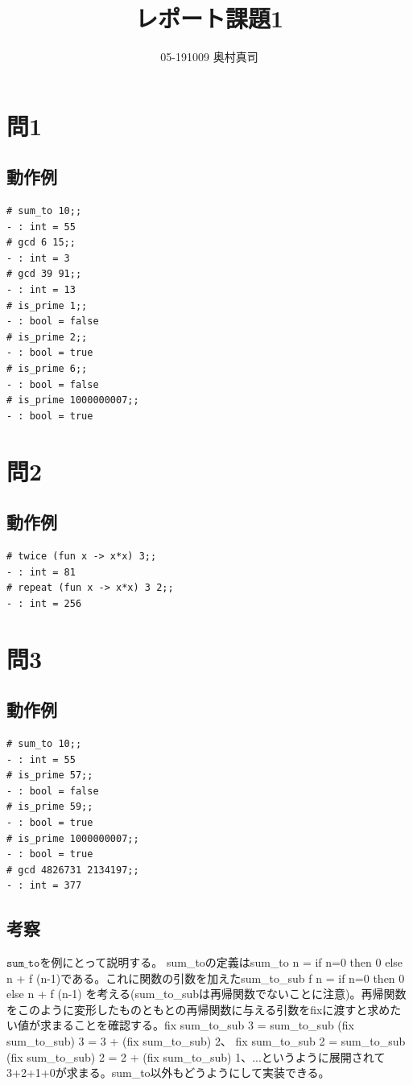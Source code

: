 \documentclass[11pt,a4paper]{jsarticle}
\title{レポート課題1}
\author{05-191009 奥村真司}
\date{}
\begin{document}
\maketitle
%
%
\section*{問1}
\subsection*{動作例}
\begin{lstlisting}[basicstyle=\ttfamily\footnotesize, frame=single]
# sum_to 10;;
- : int = 55
# gcd 6 15;;
- : int = 3
# gcd 39 91;;
- : int = 13
# is_prime 1;;
- : bool = false
# is_prime 2;;
- : bool = true
# is_prime 6;;
- : bool = false
# is_prime 1000000007;;
- : bool = true
 \end{lstlisting}

\section*{問2}
\subsection*{動作例}
\begin{lstlisting}[basicstyle=\ttfamily\footnotesize, frame=single]
# twice (fun x -> x*x) 3;;
- : int = 81
# repeat (fun x -> x*x) 3 2;;
- : int = 256
 \end{lstlisting}

\section*{問3}
\subsection*{動作例}
\begin{lstlisting}[basicstyle=\ttfamily\footnotesize, frame=single]
# sum_to 10;;
- : int = 55
# is_prime 57;;
- : bool = false
# is_prime 59;;
- : bool = true
# is_prime 1000000007;;
- : bool = true
# gcd 4826731 2134197;;
- : int = 377
\end{lstlisting}
\subsection*{考察}
$\texttt{sum\_to}$を例にとって説明する。
sum\_toの定義はsum\_to n = if n=0 then 0 else n + f (n-1)である。これに関数の引数を加えたsum\_to\_sub f n = if n=0 then 0 else n + f (n-1)
を考える(sum\_to\_subは再帰関数でないことに注意)。再帰関数をこのように変形したものともとの再帰関数に与える引数をfixに渡すと求めたい値が求まることを確認する。fix sum\_to\_sub 3 = sum\_to\_sub (fix sum\_to\_sub) 3 = 3 + (fix sum\_to\_sub) 2、
fix sum\_to\_sub 2 = sum\_to\_sub (fix sum\_to\_sub) 2 = 2 + (fix sum\_to\_sub) 1、...というように展開されて3+2+1+0が求まる。sum\_to以外もどうようにして実装できる。
\end{document}
